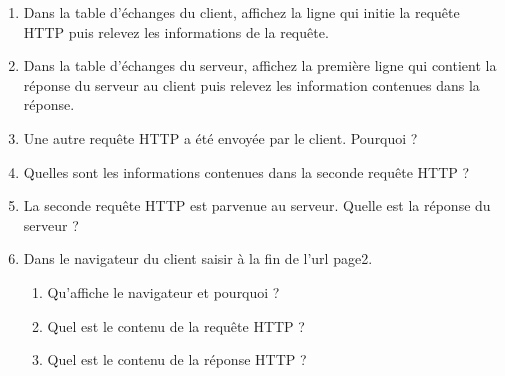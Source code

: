 \documentclass[12pt,a4paper]{article}
\begin{document}
\begin{enumerate}
\item Dans la table d'échanges du client, affichez la ligne qui initie la requête HTTP puis relevez les informations de la requête.
\vspace{5cm}

\item Dans la table d'échanges du serveur, affichez la première ligne qui contient la réponse du serveur au client puis relevez les information contenues dans la réponse.
\vspace{5cm}

\item Une autre requête HTTP a été envoyée par le client. Pourquoi ? 
\vspace{2cm}

\item Quelles sont les informations contenues dans la seconde requête HTTP ?
\vspace{4cm}

\newpage
\item La seconde requête HTTP est parvenue au serveur. Quelle est la réponse du serveur ?
\vspace{6cm}


\item Dans le navigateur du client saisir à la fin de l'url \textsf{page2}.
\begin{enumerate}
\item Qu'affiche le navigateur et pourquoi ?\vspace{1cm}
\item Quel est le contenu de la requête HTTP ? \vspace{1cm}
\item Quel est le contenu de la réponse HTTP ? \vspace{3cm}
\end{enumerate}


\end{enumerate}
%
%
\end{document}
